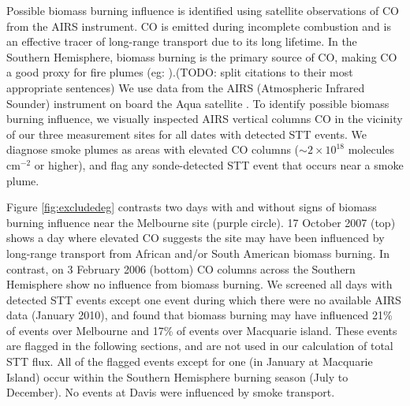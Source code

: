 \documentclass{article}
\begin{document}
    Possible biomass burning influence is identified using satellite observations of CO from the AIRS instrument.
    CO is emitted during incomplete combustion and is an effective tracer of long-range transport due to its long lifetime.
    In the Southern Hemisphere, biomass burning is the primary source of CO, making CO a good proxy for fire plumes (eg: \citet{Edwards2003,Sinha2004,Edwards2006,Mari2008}).(TODO: split citations to their most appropriate sentences)
    We use data from the AIRS (Atmospheric Infrared Sounder) instrument on board the Aqua satellite \citep{AIRS3STD}.
    To identify possible biomass burning influence, we visually inspected AIRS vertical columns CO in the vicinity of our three measurement sites for all dates with detected STT events.
    We diagnose smoke plumes as areas with elevated CO columns ($\sim 2 \times 10^{18}$ molecules cm$^{-2}$ or higher), and flag any sonde-detected STT event that occurs near a smoke plume.

    Figure \ref{fig:excludedeg} contrasts two days with and without signs of biomass burning influence near the Melbourne site (purple circle).
    17 October 2007 (top) shows a day where elevated CO suggests the site may have been influenced by long-range transport from African and/or South American biomass burning.
    In contrast, on 3 February 2006 (bottom) CO columns across the Southern Hemisphere show no influence from biomass burning.
    We screened all days with detected STT events except one event during which there were no available AIRS data (January 2010), and found that biomass burning may have influenced 21\% of events over Melbourne and 17\% of events over Macquarie island.
    These events are flagged in the following sections, and are not used in our calculation of total STT flux.
    All of the flagged events except for one (in January at Macquarie Island) occur within the Southern Hemisphere burning season (July to December).%
    No events at Davis were influenced by smoke transport.
    
\end{document}

